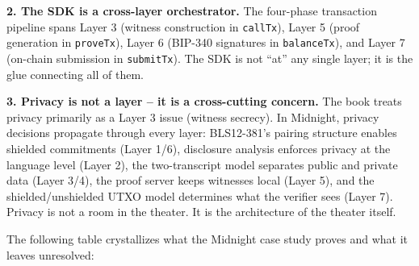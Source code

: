 \documentclass[
  11pt,
  openany]{report}
\renewcommand{\textbf}[1]{{\bfseries\color{MidnightBold}#1}}
\begin{document}
\textbf{2. The SDK is a cross-layer orchestrator.} The four-phase transaction
pipeline spans Layer 3 (witness construction in \texttt{callTx}), Layer 5 (proof
generation in \texttt{proveTx}), Layer 6 (BIP-340 signatures in
\texttt{balanceTx}), and Layer 7 (on-chain submission in \texttt{submitTx}). The
SDK is not ``at'' any single layer; it is the glue connecting all of them.

\textbf{3. Privacy is not a layer -- it is a cross-cutting concern.} The book
treats privacy primarily as a Layer 3 issue (witness secrecy). In Midnight,
privacy decisions propagate through every layer: BLS12-381's pairing structure
enables shielded commitments (Layer 1/6), disclosure analysis enforces privacy
at the language level (Layer 2), the two-transcript model separates public and
private data (Layer 3/4), the proof server keeps witnesses local (Layer 5), and
the shielded/unshielded UTXO model determines what the verifier sees (Layer 7).
Privacy is not a room in the theater. It is the architecture of the theater
itself.

The following table crystallizes what the Midnight case study proves and what it
leaves unresolved:
\end{document}
